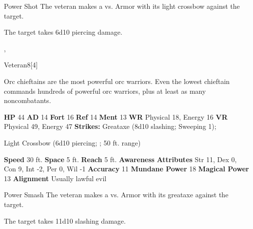     \begin{freeability}{Power Shot}
       The veteran makes a 
         vs. Armor
        with its light crossbow against the target.
    
    \hit The target takes 6d10 piercing damage.
    \end{freeability}
  ,
  \begin{monsubsection}{Veteran}{8}[4]
    \vspace{-1em}\vspace{-1em}
    \vspace{0em}

    
        Orc chieftains are the most powerful orc warriors.
        Even the lowest chieftain commands hundreds of powerful orc warriors, plus at least as many noncombatants.
      
    

    \begin{spellcontent}
      \begin{spelltargetinginfo}
        \pari \textbf{HP} 44 \monsep
          \textbf{AD} 14 \monsep
          \textbf{Fort} 16 \monsep
          \textbf{Ref} 14 \monsep
          \textbf{Ment} 13
        \pari \textbf{WR} Physical 18, Energy 16 \monsep
        \textbf{VR} Physical 49, Energy 47
        \pari \textbf{Strikes:}
            Greataxe  (8d10 slashing; Sweeping 1);
\par Light Crossbow  (6d10 piercing; ; 50 ft. range)
      \end{spelltargetinginfo}
    \end{spellcontent}
    \begin{monsterfooter}
      \pari \textbf{Speed} 30 ft. \monsep
        \textbf{Space} 5 ft. \monsep
        \textbf{Reach} 5 ft.
      \pari \textbf{Awareness} 
      \pari \textbf{Attributes}
        Str 11, Dex 0,
        Con 9, Int -2,
        Per 0, Wil -1
      \pari \textbf{Accuracy} 11 \monsep
        \textbf{Mundane Power} 18 \monsep
      \textbf{Magical Power} 13
      \pari \textbf{Alignment} Usually lawful evil
    \end{monsterfooter}
  \end{monsubsection}
  \begin{freeability}{Power Smash}
       The veteran makes a 
         vs. Armor
        with its greataxe against the target.
    
    \hit The target takes 11d10 slashing damage.
    \end{freeability}
  

